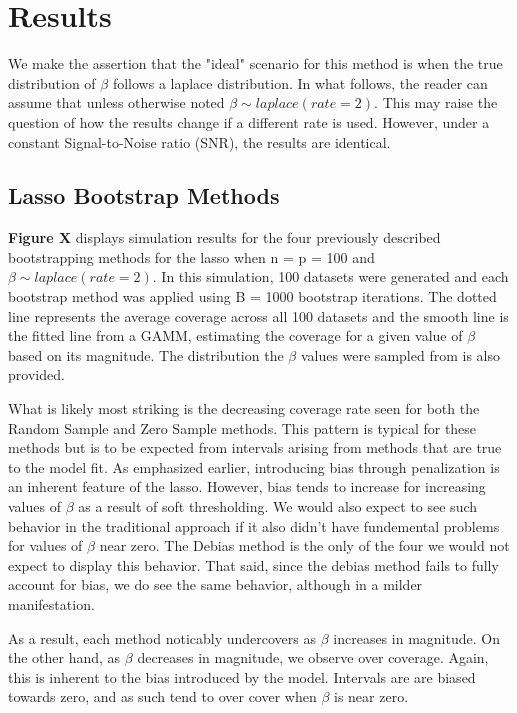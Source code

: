 \section{Results}

We make the assertion that the "ideal" scenario for this method is when the true distribution of $\beta$ follows a laplace distribution. In what follows, the reader can assume that unless otherwise noted $\beta \sim laplace(rate = 2)$. This may raise the question of how the results change if a different rate is used. However, under a constant Signal-to-Noise ratio (SNR), the results are identical.

\subsection{Lasso Bootstrap Methods}

\textbf{Figure X} displays simulation results for the four previously described bootstrapping methods for the lasso when n = p = 100 and $\beta \sim laplace(rate = 2)$. In this simulation, 100 datasets were generated and each bootstrap method was applied using B = 1000 bootstrap iterations. The dotted line represents the average coverage across all 100 datasets and the smooth line is the fitted line from a GAMM, estimating the coverage for a given value of $\beta$ based on its magnitude. The distribution the $\beta$ values were sampled from is also provided.

What is likely most striking is the decreasing coverage rate seen for both the Random Sample and Zero Sample methods. This pattern is typical for these methods but is to be expected from intervals arising from methods that are true to the model fit. As emphasized earlier, introducing bias through penalization is an inherent feature of the lasso. However, bias tends to increase for increasing values of $\beta$ as a result of soft thresholding. We would also expect to see such behavior in the traditional approach if it also didn't have fundemental problems for values of $\beta$ near zero. The Debias method is the only of the four we would not expect to display this behavior. That said, since the debias method fails to fully account for bias, we do see the same behavior, although in a milder manifestation.

As a result, each method noticably undercovers as $\beta$ increases in magnitude. On the other hand, as $\beta$ decreases in magnitude, we observe over coverage. Again, this is inherent to the bias introduced by the model. Intervals are are biased towards zero, and as such tend to over cover when $\beta$ is near zero.

